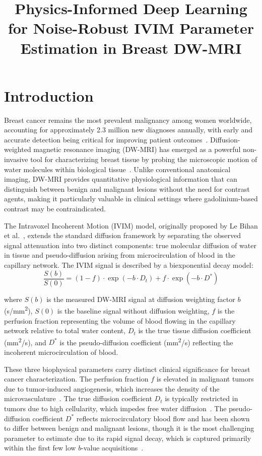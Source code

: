 \documentclass[12pt]{article}
\title{\textbf{Physics-Informed Deep Learning for Noise-Robust IVIM Parameter Estimation in Breast DW-MRI}}
\author{}
\date{}
\begin{document}
\maketitle

\section{Introduction}

Breast cancer remains the most prevalent malignancy among women worldwide, accounting for approximately 2.3 million new diagnoses annually, with early and accurate detection being critical for improving patient outcomes~\cite{sung2021}. Diffusion-weighted magnetic resonance imaging (DW-MRI) has emerged as a powerful non-invasive tool for characterizing breast tissue by probing the microscopic motion of water molecules within biological tissue~\cite{lebihan1986}. Unlike conventional anatomical imaging, DW-MRI provides quantitative physiological information that can distinguish between benign and malignant lesions without the need for contrast agents, making it particularly valuable in clinical settings where gadolinium-based contrast may be contraindicated.

The Intravoxel Incoherent Motion (IVIM) model, originally proposed by Le Bihan et al.~\cite{lebihan1988}, extends the standard diffusion framework by separating the observed signal attenuation into two distinct components: true molecular diffusion of water in tissue and pseudo-diffusion arising from microcirculation of blood in the capillary network. The IVIM signal is described by a biexponential decay model:
%
\begin{equation}
\frac{S(b)}{S(0)} = (1 - f) \cdot \exp(-b \cdot D_t) + f \cdot \exp(-b \cdot D^{*})
\label{eq:ivim}
\end{equation}

where $S(b)$ is the measured DW-MRI signal at diffusion weighting factor $b$ (s/mm\textsuperscript{2}), $S(0)$ is the baseline signal without diffusion weighting, $f$ is the perfusion fraction representing the volume of blood flowing in the capillary network relative to total water content, $D_t$ is the true tissue diffusion coefficient (mm\textsuperscript{2}/s), and $D^{*}$ is the pseudo-diffusion coefficient (mm\textsuperscript{2}/s) reflecting the incoherent microcirculation of blood.

These three biophysical parameters carry distinct clinical significance for breast cancer characterization. The perfusion fraction $f$ is elevated in malignant tumors due to tumor-induced angiogenesis, which increases the density of the microvasculature~\cite{cho2015,sigmund2011}. The true diffusion coefficient $D_t$ is typically restricted in tumors due to high cellularity, which impedes free water diffusion~\cite{cho2015}. The pseudo-diffusion coefficient $D^{*}$ reflects microcirculatory blood flow and has been shown to differ between benign and malignant lesions, though it is the most challenging parameter to estimate due to its rapid signal decay, which is captured primarily within the first few low $b$-value acquisitions~\cite{lemke2011}.
\end{document}
